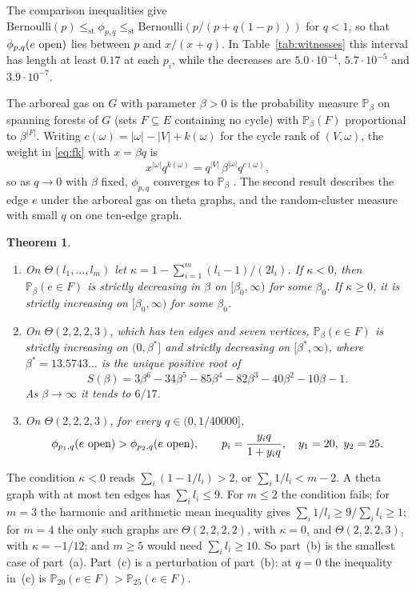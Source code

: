 \documentclass[11pt]{amsart}
\newtheorem{theorem}{Theorem}[section]
\theoremstyle{remark}
\numberwithin{equation}{section}
\newcommand{\Pp}{\mathbb P}
\newcommand{\st}{\le_{\mathrm{st}}}
\newcommand{\open}{\ \textup{open}}
\begin{document}
The comparison inequalities \cite[Theorem~3.21]{Gri06} give $\mathrm{Bernoulli}(p)\st\phi_{p,q}\st\mathrm{Bernoulli}(p/(p+q(1-p)))$ for $q<1$, so that $\phi_{p,q}(e\open)$ lies between $p$ and $x/(x+q)$. In Table~\ref{tab:witnesses} this interval has length at least $0.17$ at each $p_i$, while the decreases are $5.0\cdot10^{-4}$, $5.7\cdot10^{-5}$ and $3.9\cdot10^{-7}$.

The arboreal gas on $G$ with parameter $\beta>0$ is the probability measure $\Pp_\beta$ on spanning forests of $G$ (sets $F\subseteq E$ containing no cycle) with $\Pp_\beta(F)$ proportional to $\beta^{|F|}$. Writing $c(\omega)=|\omega|-|V|+k(\omega)$ for the cycle rank of $(V,\omega)$, the weight in \eqref{eq:fk} with $x=\beta q$ is
\begin{equation}\label{eq:cyclerank}
 x^{|\omega|}q^{k(\omega)}=q^{|V|}\,\beta^{|\omega|}q^{c(\omega)},
\end{equation}
so as $q\to0$ with $\beta$ fixed, $\phi_{p,q}$ converges to $\Pp_\beta$ \cite{HH24}. The second result describes the edge $e$ under the arboreal gas on theta graphs, and the random-cluster measure with small $q$ on one ten-edge graph.

\begin{theorem}\label{thm:arboreal}
\begin{enumerate}[label=\textup{(\alph*)},leftmargin=2em]
\item On $\Theta(l_1,\dots,l_m)$ let $\kappa=1-\sum_{i=1}^m(l_i-1)/(2l_i)$. If $\kappa<0$, then $\Pp_\beta(e\in F)$ is strictly decreasing in $\beta$ on $[\beta_0,\infty)$ for some $\beta_0$. If $\kappa\ge0$, it is strictly increasing on $[\beta_0,\infty)$ for some $\beta_0$.
\item On $\Theta(2,2,2,3)$, which has ten edges and seven vertices, $\Pp_\beta(e\in F)$ is strictly increasing on $(0,\beta^*]$ and strictly decreasing on $[\beta^*,\infty)$, where $\beta^*=13.5743\ldots$ is the unique positive root of
\[
 S(\beta)=3\beta^6-34\beta^5-85\beta^4-82\beta^3-40\beta^2-10\beta-1.
\]
As $\beta\to\infty$ it tends to $6/17$.
\item On $\Theta(2,2,2,3)$, for every $q\in(0,1/40000]$,
\[
 \phi_{p_1,q}(e\open)>\phi_{p_2,q}(e\open),\qquad p_i=\frac{y_iq}{1+y_iq},\quad y_1=20,\ y_2=25.
\]
\end{enumerate}
\end{theorem}

The condition $\kappa<0$ reads $\sum_i(1-1/l_i)>2$, or $\sum_i1/l_i<m-2$. A theta graph with at most ten edges has $\sum_il_i\le9$. For $m\le2$ the condition fails; for $m=3$ the harmonic and arithmetic mean inequality gives $\sum_i1/l_i\ge9/\sum_il_i\ge1$; for $m=4$ the only such graphs are $\Theta(2,2,2,2)$, with $\kappa=0$, and $\Theta(2,2,2,3)$, with $\kappa=-1/12$; and $m\ge5$ would need $\sum_il_i\ge10$. So part~(b) is the smallest case of part~(a). Part~(c) is a perturbation of part~(b): at $q=0$ the inequality in~(c) is $\Pp_{20}(e\in F)>\Pp_{25}(e\in F)$.
\end{document}

